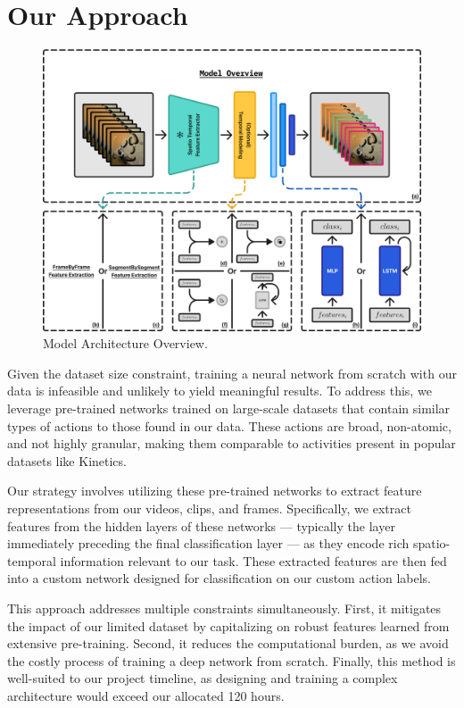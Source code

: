 \section{Our Approach}

\begin{figure}[t]
    \centering
    \includegraphics[width=\textwidth]{../../assets/figures/model-overview.png}
    \caption{Model Architecture Overview.}
    \label{fig:your-label}
\end{figure}

Given the dataset size constraint, training a neural network from scratch with our data is infeasible and unlikely to yield meaningful results. To address this, we leverage pre-trained networks trained on large-scale datasets that contain similar types of actions to those found in our data. These actions are broad, non-atomic, and not highly granular, making them comparable to activities present in popular datasets like Kinetics.

Our strategy involves utilizing these pre-trained networks to extract feature representations from our videos, clips, and frames. Specifically, we extract features from the hidden layers of these networks — typically the layer immediately preceding the final classification layer — as they encode rich spatio-temporal information relevant to our task. These extracted features are then fed into a custom network designed for classification on our custom action labels.

This approach addresses multiple constraints simultaneously. First, it mitigates the impact of our limited dataset by capitalizing on robust features learned from extensive pre-training. Second, it reduces the computational burden, as we avoid the costly process of training a deep network from scratch. Finally, this method is well-suited to our project timeline, as designing and training a complex architecture would exceed our allocated 120 hours.

